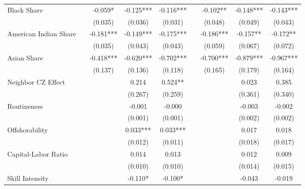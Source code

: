\begin{table}[htbp]
\begin{tabular}{l*{8}{c}}
\addlinespace
Black Share         &            &   -0.059*  &   -0.125***&   -0.116***&            &   -0.102** &   -0.148***&   -0.143***\\
                    &            &  (0.035)   &  (0.036)   &  (0.031)   &            &  (0.048)   &  (0.049)   &  (0.043)   \\
\addlinespace
American Indian Share&            &   -0.181***&   -0.149***&   -0.175***&            &   -0.186***&   -0.157** &   -0.172** \\
                    &            &  (0.035)   &  (0.043)   &  (0.043)   &            &  (0.059)   &  (0.067)   &  (0.072)   \\
\addlinespace
Asian Share         &            &   -0.418***&   -0.620***&   -0.702***&            &   -0.700***&   -0.879***&   -0.967***\\
                    &            &  (0.137)   &  (0.136)   &  (0.118)   &            &  (0.165)   &  (0.179)   &  (0.164)   \\
\addlinespace
Neighbor CZ Effect  &            &            &    0.214   &    0.524** &            &            &    0.023   &    0.385   \\
                    &            &            &  (0.267)   &  (0.259)   &            &            &  (0.361)   &  (0.340)   \\
\addlinespace
Routineness         &            &            &   -0.001   &   -0.000   &            &            &   -0.003   &   -0.002   \\
                    &            &            &  (0.001)   &  (0.001)   &            &            &  (0.002)   &  (0.002)   \\
\addlinespace
Offshorability      &            &            &    0.033***&    0.033***&            &            &    0.017   &    0.018   \\
                    &            &            &  (0.012)   &  (0.011)   &            &            &  (0.018)   &  (0.017)   \\
\addlinespace
Capital-Labor Ratio &            &            &    0.014   &    0.013   &            &            &    0.012   &    0.009   \\
                    &            &            &  (0.010)   &  (0.010)   &            &            &  (0.014)   &  (0.015)   \\
\addlinespace
Skill Intensity     &            &            &   -0.110*  &   -0.100*  &            &            &   -0.043   &   -0.019   \\

\end{tabular}
\end{table}
